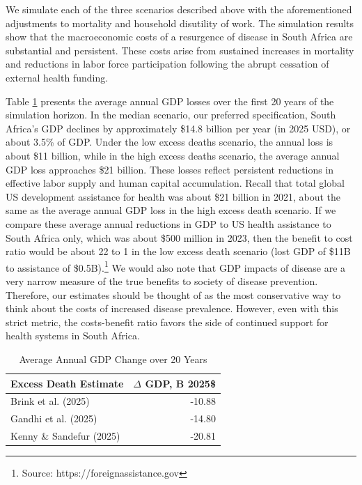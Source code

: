 \documentclass[letterpaper,12pt]{article}
\theoremstyle{definition}
\begin{document}
\begin{spacing}{1.5}
We simulate each of the three scenarios described above with the aforementioned adjustments to mortality and household disutility of work.  The simulation results show that the macroeconomic costs of a resurgence of disease in South Africa are substantial and persistent. These costs arise from sustained increases in mortality and reductions in labor force participation following the abrupt cessation of external health funding.

Table \ref{tab:avgGDPChange} presents the average annual GDP losses over the first 20 years of the simulation horizon. In the median scenario, our preferred specification, South Africa's GDP declines by approximately \$14.8 billion per year (in 2025 USD), or about 3.5\% of GDP. Under the low excess deaths scenario, the annual loss is about \$11 billion, while in the high excess deaths scenario, the average annual GDP loss approaches \$21 billion. These losses reflect persistent reductions in effective labor supply and human capital accumulation. Recall that total global US development assistance for health was about \$21 billion in 2021, about the same as the average annual GDP loss in the high excess death scenario. If we compare these average annual reductions in GDP to US health assistance to South Africa only, which was about \$500 million in 2023, then the benefit to cost ratio would be about 22 to 1 in the low excess death scenario (lost GDP of \$11B to assistance of \$0.5B).\footnote{Source: https://foreignassistance.gov} We would also note that GDP impacts of disease are a very narrow measure of the true benefits to society of disease prevention.  Therefore, our estimates should be thought of as the most conservative way to think about the costs of increased disease prevalence. However, even with this strict metric, the costs-benefit ratio favors the side of continued support for health systems in South Africa.

\begin{table}[H]
\centering
\caption{Average Annual GDP Change over 20 Years}
\begin{tabular}{lr}
  \toprule
  Excess Death Estimate & $\Delta$ GDP, B 2025\$ \\
  \midrule
  Brink et al. (2025) & -10.88 \\
  Gandhi et al. (2025) & -14.80 \\
  Kenny \& Sandefur (2025) & -20.81 \\
  \bottomrule
\end{tabular}
\label{tab:avgGDPChange}
\end{table}


\end{spacing}
\end{document}
